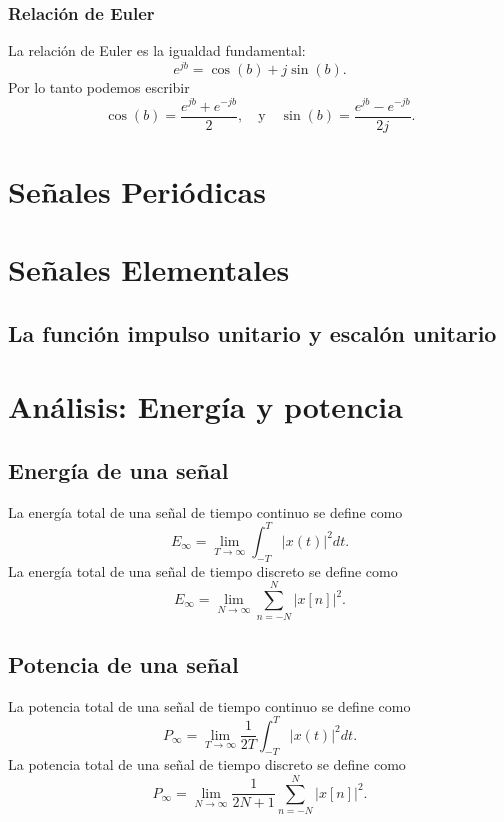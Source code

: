 \documentclass[11pt,a4paper,openany]{book}
\begin{document}
\subsubsection{Relación de Euler}
La relación de Euler es la igualdad fundamental:
\begin{equation}
	e^{j b} =  \cos(b) + j \sin(b). \label{expeuler}
\end{equation}
Por lo tanto podemos escribir
\begin{equation}
	\cos(b) = \frac{e^{j b} + e^{-j b}}{2}, \quad \text{y} \quad \sin(b) = \frac{e^{j b} - e^{-j b}}{2j}. \label{coseuler}
\end{equation}

	\section{Señales Periódicas}
	
	\section{Señales Elementales}
	
	\subsection{La función impulso unitario y escalón unitario}
	
\section{Análisis: Energía y potencia}

\subsection{Energía de una señal}
La energía total de una señal de tiempo continuo se define como
\begin{equation}
	E_{\infty } = \lim_{T \rightarrow \infty} \int_{-T}^{T} |x(t)|^2 dt.
\end{equation}
La energía total de una señal de tiempo discreto se define como
\begin{equation}
	E_{\infty } = \lim_{N \rightarrow \infty} \sum_{n=-N}^{N} |x[n]|^2.
\end{equation}

\subsection{Potencia de una señal}
La potencia total de una señal de tiempo continuo se define como
\begin{equation}
	P_{\infty } = \lim_{T \rightarrow \infty} \frac{1}{2T}\int_{-T}^{T} |x(t)|^2 dt.
\end{equation}
La potencia total de una señal de tiempo discreto se define como
\begin{equation}
	P_{\infty } = \lim_{N \rightarrow \infty} \frac{1}{2N+1}\sum_{n=-N}^{N} |x[n]|^2.
\end{equation}
\end{document}
